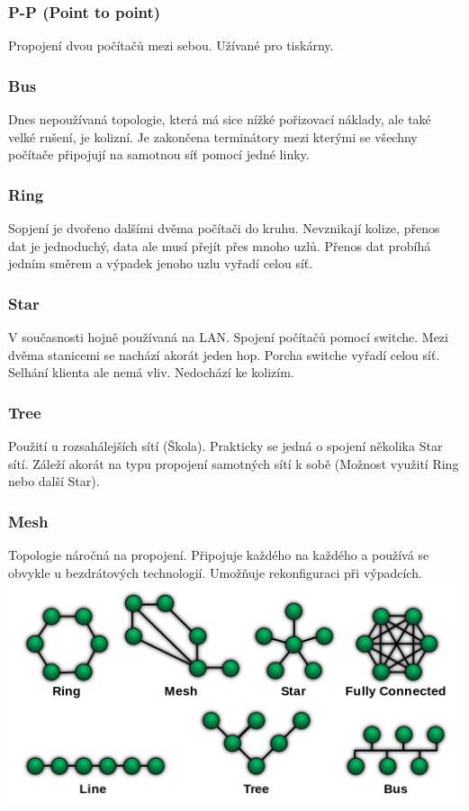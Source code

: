 \subsubsection{P-P (Point to point)}
Propojení dvou počítačů mezi sebou. Užívané pro tiskárny.
\subsubsection{Bus}
Dnes nepoužívaná topologie, která má sice nížké pořizovací náklady, ale také velké rušení, je kolizní.
Je zakončena terminátory mezi kterými se všechny počítače připojují na samotnou síť pomocí jedné linky.
\subsubsection{Ring}
Sopjení je dvořeno dalšími dvěma počítači do kruhu.
Nevznikají kolize, přenos dat je jednoduchý, data ale musí přejít přes mnoho uzlů.
Přenos dat probíhá jedním směrem a výpadek jenoho uzlu vyřadí celou síť.
\subsubsection{Star}
V současnosti hojně používaná na LAN.
Spojení počítačů pomocí switche.
Mezi dvěma stanicemi se nachází akorát jeden hop.
Porcha switche vyřadí celou síť.
Selhání klienta ale nemá vliv.
Nedochází ke kolizím.
\subsubsection{Tree}
Použití u rozsahálejších sítí (Škola).
Prakticky se jedná o spojení několika Star sítí.
Záleží akorát na typu propojení samotných sítí k sobě (Možnost využití Ring nebo další Star). 
\subsubsection{Mesh}
Topologie náročná na propojení.
Připojuje každého na každého a používá se obvykle u bezdrátových technologií.
Umožňuje rekonfiguraci při výpadcích.\\
\includegraphics[width=\linewidth]{TVY-POS/Rozdeleni-siti/topologie-siti.png}